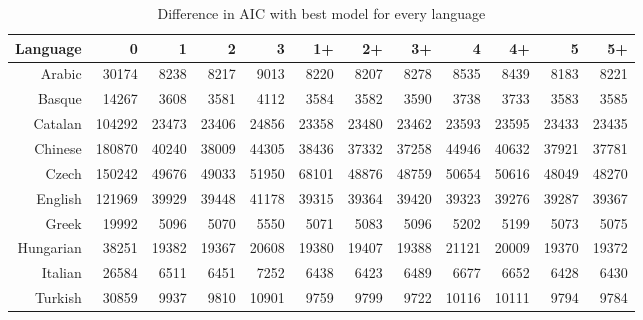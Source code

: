 \documentclass[paper=a4, fontsize=11pt]{scrartcl} %
\begin{document}
\begin{table}
\begin{adjustbox}{center}
\centering
\begin{tabular}{rrrrrrrrrrrr}
 Language & 0 & 1 & 2 & 3 & 1+ & 2+ & 3+ & 4 & 4+ & 5 & 5+ \\ 
  \midrule
Arabic & 30174 & 8238 & 8217 & 9013 & 8220 & 8207 & 8278 & 8535 & 8439 & 8183 & 8221 \\ 
  Basque & 14267 & 3608 & 3581 & 4112 & 3584 & 3582 & 3590 & 3738 & 3733 & 3583 & 3585 \\ 
  Catalan & 104292 & 23473 & 23406 & 24856 & 23358 & 23480 & 23462 & 23593 & 23595 & 23433 & 23435 \\ 
  Chinese & 180870 & 40240 & 38009 & 44305 & 38436 & 37332 & 37258 & 44946 & 40632 & 37921 & 37781 \\ 
  Czech & 150242 & 49676 & 49033 & 51950 & 68101 & 48876 & 48759 & 50654 & 50616 & 48049 & 48270 \\ 
  English & 121969 & 39929 & 39448 & 41178 & 39315 & 39364 & 39420 & 39323 & 39276 & 39287 & 39367 \\ 
  Greek & 19992 & 5096 & 5070 & 5550 & 5071 & 5083 & 5096 & 5202 & 5199 & 5073 & 5075 \\ 
  Hungarian & 38251 & 19382 & 19367 & 20608 & 19380 & 19407 & 19388 & 21121 & 20009 & 19370 & 19372 \\ 
  Italian & 26584 & 6511 & 6451 & 7252 & 6438 & 6423 & 6489 & 6677 & 6652 & 6428 & 6430 \\ 
  Turkish & 30859 & 9937 & 9810 & 10901 & 9759 & 9799 & 9722 & 10116 & 10111 & 9794 & 9784 \\ 
   \bottomrule
\end{tabular}
\end{adjustbox}
\caption{Difference in AIC with best model for every language}
\end{table}
\end{document}
